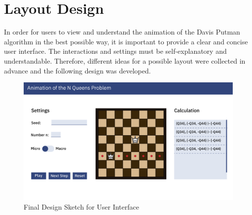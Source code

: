 \section{Layout Design}
In order for users to view and understand the animation of the Davis Putman algorithm in the best possible way, it is important to provide a clear and concise user interface. The interactions and settings must be self-explanatory and understandable. Therefore, different ideas for a possible layout were collected in advance and the following design was developed. 
\begin{figure}[h]
  \centering
  \includegraphics[width=\textwidth]{img/Design_N_Queens}
  \caption{Final Design Sketch for User Interface}
  \label{fig:design}
\end{figure}
